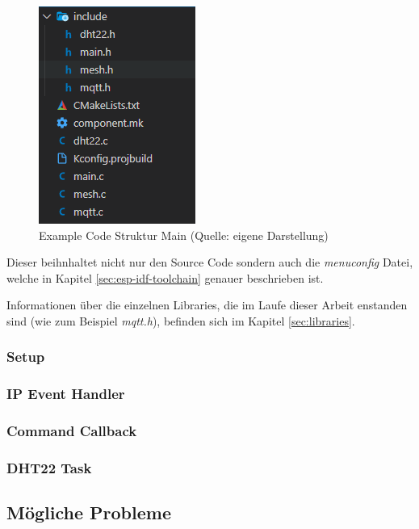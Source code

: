 \begin{figure}[H]
    \begin{center}
        \includegraphics[scale=0.8]{images/example_code_structure_main.png}
        \caption{Example Code Struktur Main (Quelle: eigene Darstellung)}
        \label{abb:example_code_structure_main}
    \end{center}
\end{figure}

Dieser beihnhaltet nicht nur den Source Code sondern auch die \textit{menuconfig} Datei, welche in Kapitel \ref{sec:esp-idf-toolchain} genauer beschrieben ist.

Informationen über die einzelnen Libraries, die im Laufe dieser Arbeit enstanden sind (wie zum Beispiel \textit{mqtt.h}), befinden sich im Kapitel \ref{sec:libraries}.

\subsubsection{Setup}
\subsubsection{IP Event Handler}
\subsubsection{Command Callback}
\subsubsection{DHT22 Task}
\subsection{Mögliche Probleme}

